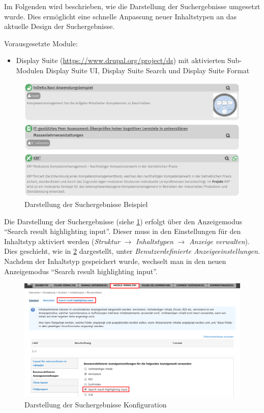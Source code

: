 Im Folgenden wird beschrieben, wie die Darstellung der Suchergebnisse umgesetzt wurde. Dies ermöglicht eine schnelle Anpassung neuer Inhaltstypen an das aktuelle Design der Suchergebnisse.

Vorausgesetzte Module:
\begin{itemize}
	\item Display Suite (\url{https://www.drupal.org/project/ds}) mit aktivierten Sub-Modulen Display Suite UI, Display Suite Search und Display Suite Format
\end{itemize}


\begin{figure}[H]
	\centering
	\includegraphics[height=0.20\textheight]{images/example_searchresult}
	\caption{Darstellung der Suchergebnisse Beispiel}
	\label{fig:example_searchresult}
\end{figure}



Die Darstellung der Suchergebnisse (siehe \cref{fig:example_searchresult}) erfolgt über den Anzeigemodus \enquote{Search result highlighting input}. Dieser muss in den Einstellungen für den Inhaltstyp aktiviert werden (\textit{Struktur} $\rightarrow$ \textit{Inhaltstypen} $\rightarrow$ \textit{Anzeige verwalten}). Dies geschieht, wie in \cref{fig:config_searchresult_viewmode} dargestellt, unter \textit{Benutzerdefinierte Anzeigeeinstellungen}. Nachdem der Inhaltstyp gespeichert wurde, wechselt man in den neuen Anzeigemodus \enquote{Search result highlighting input}.

\begin{figure}[H]
	\centering
	\includegraphics[height=0.20\textheight]{images/config_searchresult_viewmode}
	\caption{Darstellung der Suchergebnisse Konfiguration}
	\label{fig:config_searchresult_viewmode}
\end{figure}


